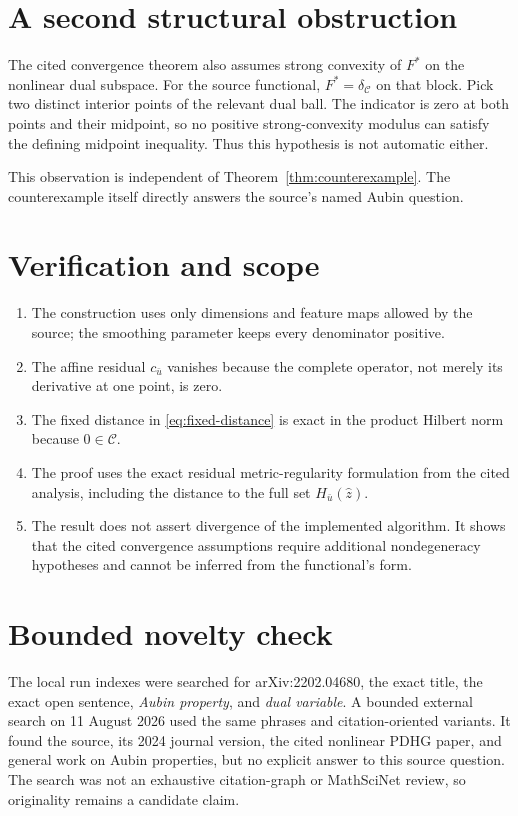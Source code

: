 \documentclass[11pt]{article}
\newcommand{\ind}{\delta}
\begin{document}
\section{A second structural obstruction}

The cited convergence theorem also assumes strong convexity of \(F^*\) on
the nonlinear dual subspace. For the source functional,
\(F^*=\ind_{\mathcal C}\) on that block. Pick two distinct interior points
of the relevant dual ball. The indicator is zero at both points and their
midpoint, so no positive strong-convexity modulus can satisfy the defining
midpoint inequality. Thus this hypothesis is not automatic either.

This observation is independent of Theorem~\ref{thm:counterexample}. The
counterexample itself directly answers the source's named Aubin question.

\section{Verification and scope}

\begin{enumerate}[leftmargin=*,itemsep=0.35em]
 \item The construction uses only dimensions and feature maps allowed by the
 source; the smoothing parameter keeps every denominator positive.
 \item The affine residual \(c_{\bar u}\) vanishes because the complete
 operator, not merely its derivative at one point, is zero.
 \item The fixed distance in \eqref{eq:fixed-distance} is exact in the product
 Hilbert norm because \(0\in\mathcal C\).
 \item The proof uses the exact residual metric-regularity formulation from
 the cited analysis, including the distance to the full set
 \(H_{\bar u}(\widehat z)\).
 \item The result does not assert divergence of the implemented algorithm.
 It shows that the cited convergence assumptions require additional
 nondegeneracy hypotheses and cannot be inferred from the functional's form.
\end{enumerate}

\section{Bounded novelty check}

The local run indexes were searched for arXiv:2202.04680, the exact title,
the exact open sentence, \emph{Aubin property}, and \emph{dual variable}. A
bounded external search on 11 August 2026 used the same phrases and
citation-oriented variants. It found the source, its 2024 journal version, the
cited nonlinear PDHG paper, and general work on Aubin properties, but no
explicit answer to this source question. The search was not an exhaustive
citation-graph or MathSciNet review, so originality remains a candidate claim.
\end{document}
